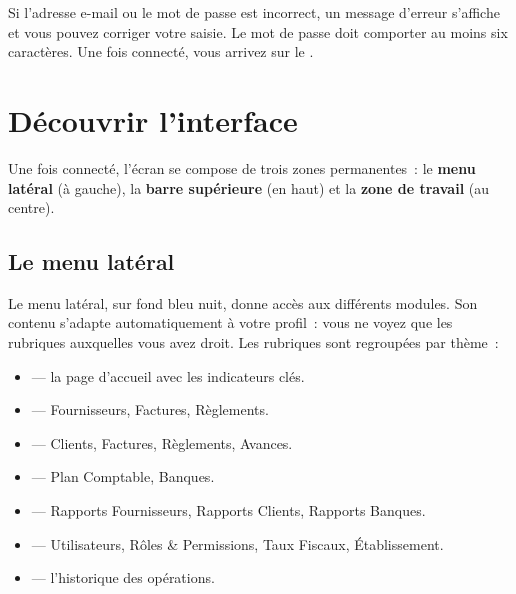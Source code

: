 Si l'adresse e-mail ou le mot de passe est incorrect, un message d'erreur s'affiche et vous pouvez corriger votre saisie. Le mot de passe doit comporter au moins six caractères. Une fois connecté, vous arrivez sur le .



\section{Découvrir l'interface}

Une fois connecté, l'écran se compose de trois zones permanentes~: le \textbf{menu latéral} (à gauche), la \textbf{barre supérieure} (en haut) et la \textbf{zone de travail} (au centre).

\subsection{Le menu latéral}

Le menu latéral, sur fond bleu nuit, donne accès aux différents modules. Son contenu s'adapte automatiquement à votre profil~: vous ne voyez que les rubriques auxquelles vous avez droit. Les rubriques sont regroupées par thème~:

\begin{itemize}
  \item {} — la page d'accueil avec les indicateurs clés.
  \item {} — Fournisseurs, Factures, Règlements.
  \item {} — Clients, Factures, Règlements, Avances.
  \item {} — Plan Comptable, Banques.
  \item {} — Rapports Fournisseurs, Rapports Clients, Rapports Banques.
  \item {} — Utilisateurs, Rôles \& Permissions, Taux Fiscaux, Établissement.
  \item {} — l'historique des opérations.
\end{itemize}

